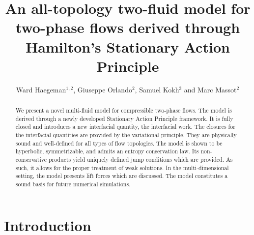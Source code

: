 \documentclass{myclass}
\newcommand{\absbreak}{}
\begin{document}
\title{An all-topology two-fluid model for two-phase flows derived through Hamilton's Stationary Action Principle}
\author{Ward Haegeman$^{1,2}$,
Giuseppe Orlando$^{2}$,
Samuel Kokh$^{3}$
and
Marc Massot$^{2}$}

\address{$^{1}$DMPE, ONERA, Université Paris-Saclay, F-91123 Palaiseau, France\\
$^{2}$CMAP, CNRS, École polytechnique, Institut Polytechnique de Paris, Route de Saclay, 91120 Palaiseau, France\\
$^{3}$Maison de la Simulation, UAR 3441, Bâtiment 565 PC 190 - Digiteo, CEA Saclay 91191, Gif-sur-Yvette, France}

\subject{applied mathematics, mathematical modelling, fluid mechanics}



\maketitle
\begin{abstract}
We present a novel multi-fluid model for compressible two-phase flows. The model is derived through a newly developed Stationary Action Principle framework. It is fully closed and introduces a new interfacial quantity, the interfacial work. The closures for the interfacial quantities are provided by the variational principle. They are physically sound and well-defined for all types of flow topologies. The model is shown to be hyperbolic, symmetrizable, and admits an entropy conservation law. Its non-conservative products yield uniquely defined jump conditions which are provided. As such, it allows for the proper treatment of weak solutions. In the multi-dimensional setting, the model presents lift forces which are discussed. The model constitutes a sound basis for future numerical simulations. \absbreak
\end{abstract} 
\newpage

\section{Introduction}
\end{document}
